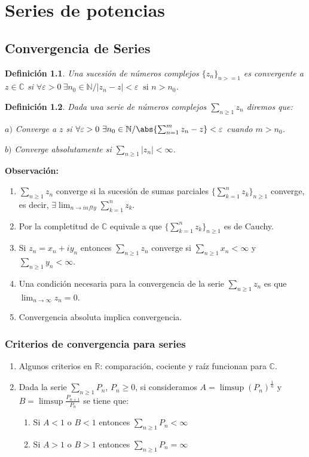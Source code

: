 \documentclass[12pt]{book}
\newtheorem{defi}{Definición}[chapter]
\newcommand{\R}{\mathbb{R}}
\newcommand{\C}{\mathbb{C}}
\newcommand{\N}{\mathbb{N}}
\begin{document}
\chapter{Series de potencias}
\section{Convergencia de Series}
\begin{defi}
Una sucesión de números complejos $\{z_n\}_{n>=1}$ es convergente a $z\in\C$ si $\forall\varepsilon>0 \ \exists n_0\in\N / |z_n-z|<\varepsilon\ \text{ si } n>n_0$.
\end{defi}

\begin{defi}
Dada una serie de números complejos $\sum_{n\geq 1} z_n$ diremos que:

$a)$ Converge a $z$ si $\forall \varepsilon>0\ \exists n_0\in\N / \abs{\sum_{n=1}^mz_n-z} <\varepsilon$ cuando $m> n_0$.

$b)$ Converge absolutamente si $\sum_{n\geq 1} |z_n| < \infty$.
\end{defi}
\textbf{Observación:}
\begin{enumerate}
\item $\sum_{n\geq 1} z_n$ converge si la sucesión de sumas parciales $\{\sum_{k=1}^n z_k\}_{n\geq 1}$ converge, es decir, $\exists \lim_{n\to infty}\sum_{k=1}^n z_k$.
\item Por la completitud de $\C$ equivale a que $\{\sum_{k=1}^n z_k\}_{n\geq 1}$ es de Cauchy.
\item Si $z_n = x_n + iy_n$ entonces $\sum_{n\geq 1} z_n$ converge si $\sum_{n\geq 1} x_n < \infty$  y $\sum_{n\geq 1} y_n<\infty$.
\item Una condición necesaria para la convergencia de la serie $\sum_{n\geq 1} z_n$ es que $\lim_{n\to \infty} z_n = 0$.
\item Convergencia absoluta implica convergencia.
\end{enumerate}

\subsection{Criterios de convergencia para series}

\begin{enumerate}
\item Algunos criterios en $\R$: comparación, cociente y raíz funcionan para $\C$.
\item Dada la serie $\sum_{n\geq 1} P_n$, $P_n\geq 0$, si consideramos $A = \limsup(P_n)^{\frac{1}{n}}$ y $B = \limsup\frac{P_{n+1}}{P_n}$ se tiene que:
	\begin{enumerate}
	\item Si $A <1$ o $B<1$ entonces $\sum_{n\geq 1} P_n< \infty$
	\item Si $A >1$ o $B>1$ entonces $\sum_{n\geq 1} P_n= \infty$
	\end{enumerate}
\end{enumerate}
\end{document}
